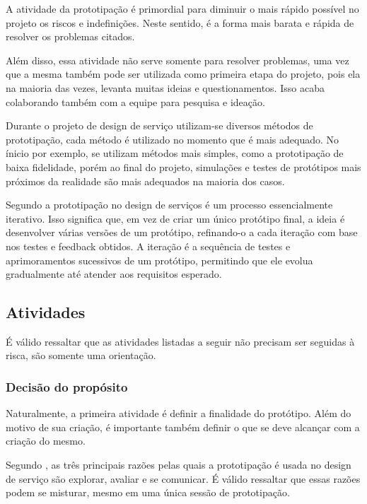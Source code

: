 A atividade da prototipação é primordial para diminuir o mais rápido possível no projeto os riscos e indefinições. Neste sentido, é a forma mais barata e rápida de resolver os problemas citados.

Além disso, essa atividade não serve somente para resolver problemas, uma vez que a mesma também pode ser utilizada como primeira etapa do projeto, pois ela na maioria das vezes, levanta muitas ideias e questionamentos. Isso acaba colaborando também com a equipe para pesquisa e ideação.

Durante o projeto de design de serviço utilizam-se diversos métodos de prototipação, cada método é utilizado no momento que é mais adequado. No ínicio por exemplo, se utilizam métodos mais simples, como a prototipação de baixa fidelidade, porém ao final do projeto, simulações e testes de protótipos mais próximos da realidade são mais adequados na maioria dos casos. 

Segundo \cite{Christie2012} a prototipação no design de serviços é um processo essencialmente iterativo. Isso significa que, em vez de criar um único protótipo final, a ideia é desenvolver várias versões de um protótipo, refinando-o a cada iteração com base nos testes e feedback obtidos. A iteração é a sequência de testes e aprimoramentos sucessivos de um protótipo, permitindo que ele evolua gradualmente até atender aos requisitos esperado.

\subsection{Atividades}

É válido ressaltar que as atividades listadas a seguir não precisam ser seguidas à risca, são somente uma orientação.

\subsubsection{Decisão do propósito}

Naturalmente, a primeira atividade é definir a finalidade do protótipo. Além do motivo de sua criação, é importante também definir o que se deve alcançar com a criação do mesmo.

Segundo \cite{Stickdorn2019}, as três principais razões pelas quais a prototipação é usada no design de serviço são explorar, avaliar e se comunicar. É válido ressaltar que essas razões podem se misturar, mesmo em uma única sessão de prototipação.

